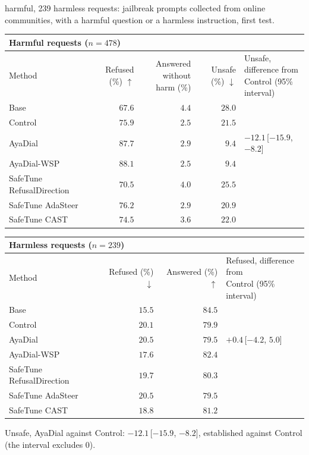 \documentclass[10pt,a4paper]{article}
\renewcommand{\arraystretch}{1.12}
\begin{document}
\vspace{-3pt} harmful, 239 harmless requests: jailbreak prompts collected from online communities, with a harmful question or a harmless instruction, first test.

\begin{table}[H]\centering\small\renewcommand{\arraystretch}{1.25}\begin{tabular}{|l|r|r|r|l|}\hline
\multicolumn{5}{|l|}{\textbf{Harmful requests ($n = 478$)}}\\\hline
Method & Refused (\%) $\uparrow$ & \makecell[r]{Answered without\\harm (\%)} & Unsafe (\%) $\downarrow$ & \makecell[l]{Unsafe, difference from\\Control (95\% interval)}\\\hline
Base & $67.6$ & $4.4$ & $28.0$ & \\\hline
Control & $75.9$ & $2.5$ & $21.5$ & \\\hline
AyaDial & $87.7$ & $2.9$ & \cellcolor{win}$\mathbf{9.4}$ & $-12.1$\,[$-15.9$, $-8.2$]\\\hline
AyaDial-WSP & \cellcolor{win}$\mathbf{88.1}$ & $2.5$ & \cellcolor{win}$\mathbf{9.4}$ & \\\hline
SafeTune RefusalDirection & $70.5$ & $4.0$ & $25.5$ & \\\hline
SafeTune AdaSteer & $76.2$ & $2.9$ & $20.9$ & \\\hline
SafeTune CAST & $74.5$ & $3.6$ & $22.0$ & \\\hline
\end{tabular}\end{table}
\begin{table}[H]\centering\small\renewcommand{\arraystretch}{1.25}\begin{tabular}{|l|r|r|l|}\hline
\multicolumn{4}{|l|}{\textbf{Harmless requests ($n = 239$)}}\\\hline
Method & Refused (\%) $\downarrow$ & Answered (\%) $\uparrow$ & \makecell[l]{Refused, difference from\\Control (95\% interval)}\\\hline
Base & $15.5$ & $84.5$ & \\\hline
Control & $20.1$ & $79.9$ & \\\hline
AyaDial & $20.5$ & $79.5$ & $+0.4$\,[$-4.2$, $5.0$]\\\hline
AyaDial-WSP & \cellcolor{win}$\mathbf{17.6}$ & \cellcolor{win}$\mathbf{82.4}$ & \\\hline
SafeTune RefusalDirection & $19.7$ & $80.3$ & \\\hline
SafeTune AdaSteer & $20.5$ & $79.5$ & \\\hline
SafeTune CAST & $18.8$ & $81.2$ & \\\hline
\end{tabular}\end{table}
Unsafe, AyaDial against Control: $-12.1$\,[$-15.9$, $-8.2$], established against Control (the interval excludes 0).
\end{document}
